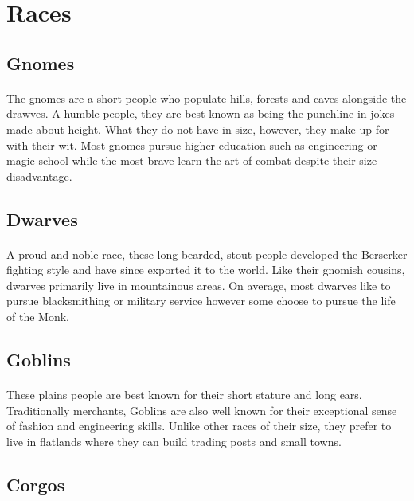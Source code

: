 \section{Races}

\subsection{Gnomes}

\paragraph{} The gnomes are a short people who populate hills, forests and caves alongside the drawves. A humble people, they are best known as being the punchline in jokes made about height. What they do not have in size, however, they make up for with their wit. Most gnomes pursue higher education such as engineering or magic school while the most brave learn the art of combat despite their size disadvantage.

\subsection{Dwarves}

\paragraph{} A proud and noble race, these long-bearded, stout people developed the Berserker fighting style and have since exported it to the world. Like their gnomish cousins, dwarves primarily live in mountainous areas. On average, most dwarves like to pursue blacksmithing or military service however some choose to pursue the life of the Monk.

\subsection{Goblins}

\paragraph{} These plains people are best known for their short stature and long ears. Traditionally merchants, Goblins are also well known for their exceptional sense of fashion and engineering skills. Unlike other races of their size, they prefer to live in flatlands where they can build trading posts and small towns.

\subsection{Corgos}

